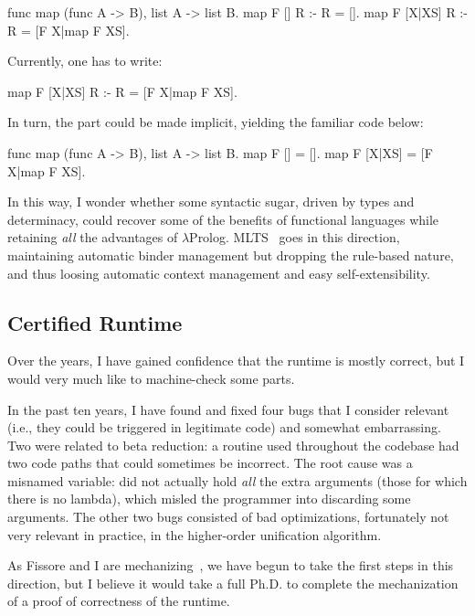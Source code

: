 \documentclass{these-ISSS}
\newenvironment{elpicode}
  {\VerbatimEnvironment\begin{elpibox}\begin{xelpicode}}{\end{xelpicode}
\end{elpibox}}
\begin{document}
\begin{elpicode}
func map (func A -> B), list A -> list B.
map F [] R :- R = [].
map F [X|XS] R :- R = [F X|map F XS].
\end{elpicode}

\noindent Currently, one has to write:
\begin{elpicode}
map F [X|XS] R :- R = [{F X}|{map F XS}].
\end{elpicode}

\noindent In turn, the  part could be made implicit, yielding the
familiar code below:

\begin{elpicode}
func map (func A -> B), list A -> list B.
map F [] = [].
map F [X|XS] = [F X|map F XS].
\end{elpicode}

\noindent In this way, I wonder whether some syntactic sugar, driven by types
and determinacy, could recover some of the benefits of functional languages
while retaining \emph{all} the advantages of $\lambda$Prolog.
MLTS~\cite{mlts} goes in this direction, maintaining automatic binder
management but dropping the rule-based nature, and thus loosing automatic context
management and easy self-extensibility.

\subsection{Certified Runtime}

Over the years, I have gained confidence that the runtime is mostly correct,
but I would very much like to machine-check some parts.

In the past ten years, I have found and fixed four bugs that I consider
relevant (i.e., they could be triggered in legitimate code) and somewhat
embarrassing. Two were related to beta reduction: a routine used throughout
the codebase had two code paths that could sometimes be
incorrect. The root cause was a misnamed variable:  did not
actually hold \emph{all} the extra arguments (those for which there is no
lambda), which misled the programmer into discarding some arguments. The other
two bugs consisted of bad optimizations, fortunately not very relevant in
practice, in the higher-order unification algorithm.

As Fissore and I are mechanizing~\cite{elpidet}, we have begun to take the
first steps in this direction, but I believe it would take a full Ph.D. to
complete the mechanization of a proof of correctness of the runtime.
\end{document}
